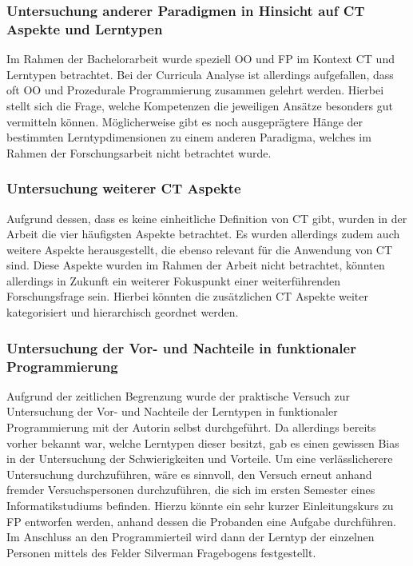 \subsubsection{Untersuchung anderer Paradigmen in Hinsicht auf CT Aspekte und Lerntypen}
Im Rahmen der Bachelorarbeit wurde speziell OO und FP im Kontext CT und Lerntypen betrachtet. Bei der Curricula Analyse ist allerdings aufgefallen, dass oft OO und Prozedurale Programmierung zusammen gelehrt werden. Hierbei stellt sich die Frage, welche Kompetenzen die jeweiligen Ansätze besonders gut vermitteln können.
Möglicherweise gibt es noch ausgeprägtere Hänge der bestimmten Lerntypdimensionen zu einem anderen Paradigma, welches im Rahmen der Forschungsarbeit nicht betrachtet wurde.

\subsubsection{Untersuchung weiterer CT Aspekte}
Aufgrund dessen, dass es keine einheitliche Definition von CT gibt, wurden in der Arbeit die vier häufigsten Aspekte betrachtet. Es wurden allerdings zudem auch weitere Aspekte herausgestellt, die ebenso relevant für die Anwendung von CT sind. Diese Aspekte wurden im Rahmen der Arbeit nicht betrachtet, könnten allerdings in Zukunft ein weiterer Fokuspunkt einer weiterführenden Forschungsfrage sein. Hierbei könnten die zusätzlichen CT Aspekte weiter kategorisiert und hierarchisch geordnet werden.

\subsubsection{Untersuchung der Vor- und Nachteile in funktionaler Programmierung}\label{sec:empirical}
Aufgrund der zeitlichen Begrenzung wurde der praktische Versuch zur Untersuchung der Vor- und Nachteile der Lerntypen in funktionaler Programmierung mit der Autorin selbst durchgeführt. Da allerdings bereits vorher bekannt war, welche Lerntypen dieser besitzt, gab es einen gewissen Bias in der Untersuchung der Schwierigkeiten und Vorteile.
Um eine verlässlicherere Untersuchung durchzuführen, wäre es sinnvoll, den Versuch erneut anhand fremder Versuchspersonen durchzuführen, die sich im ersten Semester eines Informatikstudiums befinden.
Hierzu könnte ein sehr kurzer Einleitungskurs zu FP entworfen werden, anhand dessen die Probanden eine Aufgabe durchführen. Im Anschluss an den Programmierteil wird dann der Lerntyp der einzelnen Personen mittels des Felder Silverman Fragebogens festgestellt.

